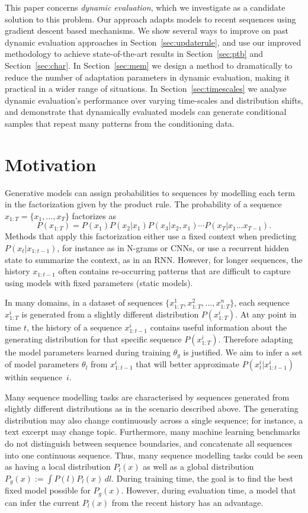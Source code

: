 \documentclass{article} \usepackage{iclr2018_conference,times}
\begin{document}
This paper concerns \emph{dynamic evaluation}, which we investigate as a candidate solution to this problem. Our approach adapts models to recent sequences using gradient descent based mechanisms. We show several ways to improve on past dynamic evaluation approaches in Section~\ref{sec:updaterule}, and use our improved methodology to achieve state-of-the-art results in Section~\ref{sec:ptb} and Section~\ref{sec:char}. In Section~\ref{sec:mem} we design a method to dramatically to reduce the number of adaptation parameters in dynamic evaluation, making it practical in a wider range of situations. In Section~\ref{sec:timescales} we analyse dynamic evaluation's performance over varying time-scales and distribution shifts, and demonstrate that dynamically evaluated models can generate conditional samples that repeat many patterns from the conditioning data. 

\section{Motivation}
Generative models can assign probabilities to sequences by modelling each term in the factorization given by the product rule. 
The probability of a sequence $x_{1:T} = \{x_1,\dots,x_T\}$ factorizes as
\begin{equation}
P(x_{1:T}) = P(x_1) P(x_2|x_1)P(x_3|x_2,x_1)\cdots P(x_T|x_1\dots x_{T-1}).
\end{equation} 
Methods that apply this factorization either use a fixed context when predicting $P(x_t|x_{1:t-1})$, for instance as in N-grams or CNNs, or use a recurrent hidden state to summarize the context, as in an RNN\@. However, for longer sequences, the history $x_{1:t-1}$ often contains re-occurring patterns that are difficult to capture using models with fixed parameters (static models).

In many domains, in a dataset of sequences $\{x^1_{1:T},x^2_{1:T},...,x^n_{1:T}\}$, each sequence $x^i_{1:T}$ is generated from a slightly different distribution $P(x^i_{1:T})$. At any point in time $t$, the history of a sequence $x^{i}_{1:t-1}$ contains useful information about the generating distribution for that specific sequence $P(x^i_{1:T})$.  Therefore adapting the model parameters learned during training $\theta_g$ is justified. We aim to infer a set of model parameters $\theta_l$ from $x^i_{1:t-1}$ that will better approximate $P(x^i_t|x^i_{1:t-1})$ within sequence~$i$.


Many sequence modelling tasks are characterised by sequences generated from slightly different distributions as in the scenario described above. The generating distribution may also change continuously across a single sequence; for instance, a text excerpt may change topic. Furthermore, many machine learning benchmarks do not distinguish between sequence boundaries, and concatenate all sequences into one continuous sequence. 
Thus, many sequence modelling tasks could be seen as having a local distribution $P_l(x)$ as well as a global distribution $P_g(x) := \int P(l) P_l(x) \, dl$. During training time, the goal is to find the best fixed model possible for $P_g(x)$. However, during evaluation time, a model that can infer the current $P_l(x)$ from the recent history has an advantage.
\end{document}
